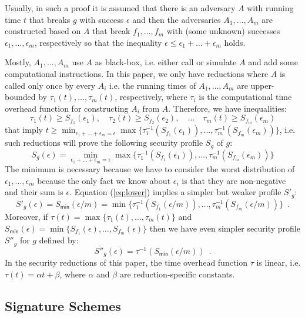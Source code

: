 \documentclass{article}
\begin{document}
Usually, in such a proof it is assumed that there is an adversary $A$ with running time $t$ that breaks $g$ with success $\epsilon$ and then the adversaries $A_1,\ldots, A_m$ are constructed based on $A$ that break $f_1,\ldots,f_m$ with (some unknown) successes  $\epsilon_1,\ldots,\epsilon_m$, respectively so that the inequality $\epsilon\le \epsilon_1 + \ldots + \epsilon_m$ holds.

Mostly, $A_1, \ldots, A_m$ use $A$ as black-box, i.e. either call or simulate $A$ and add some computational instructions. In this paper, we only have reductions where $A$ is called only once by every $A_i$ i.e. the running times of $A_1,\ldots,A_m$ are upper-bounded by $\tau_1(t), \ldots, \tau_m(t)$, respectively, where $\tau_i$ is the computational time overhead function for constructing $A_i$ from $A$.
Therefore, we have inequalities:
\[
\tau_1(t) \ge S_{f_1}(\epsilon_1), \quad \tau_2(t) \ge S_{f_2}(\epsilon_2), \quad \ldots\quad
\tau_m(t)\ge S_{f_m}(\epsilon_m)
\]
that imply $t\ge \min_{\epsilon_1 + \ldots + \epsilon_m = \epsilon}\max\{\tau^{-1}_1(S_{f_1}(\epsilon_1)), \ldots, \tau^{-1}_m(S_{f_m}(\epsilon_m))\}$, i.e. such reductions will prove the following security profile $S_g$ of $g$:
\begin{equation}\label{eq:lower}
S_g(\epsilon) = \min_{\epsilon_1 + \ldots + \epsilon_m = \epsilon}\max\{\tau^{-1}_1(S_{f_1}(\epsilon_1)), \ldots, \tau^{-1}_m(S_{f_m}(\epsilon_m))\}
\end{equation}
The minimum is necessary because we have to consider the worst distribution of $\epsilon_1,\ldots, \epsilon_m$ because the only fact we know about $\epsilon_i$ is that they are non-negative and their sum is $\epsilon$.
Equation (\ref{eq:lower}) implies a simpler but weaker profile $S'_g$:
\[
S'_g(\epsilon) = S_\mathsf{min}(\epsilon /m) =
 \min\{\tau^{-1}_1(S_{f_1}(\epsilon/m)), \ldots, \tau^{-1}_m(S_{f_m}(\epsilon/m))\}\enspace.
\]
Moreover, if $\tau(t)=\max\{\tau_1(t), \ldots, \tau_m(t)\}$ and $S_\mathsf{min}(\epsilon)= \min\{S_{f_1}(\epsilon), \ldots, S_{f_m}(\epsilon)\}$ then we have even simpler security profile $S''_g$ for $g$ defined by:
\begin{equation}\label{eq:losebound}
S''_g(\epsilon) = \tau^{-1}(S_\mathsf{min}(\epsilon/m))\enspace.
\end{equation}
In the security reductions of this paper, the time overhead function $\tau$ is linear, i.e. $\tau(t) = \alpha t + \beta$, where $\alpha$ and $\beta$ are reduction-specific constants.

\subsection{Signature Schemes}
\end{document}
